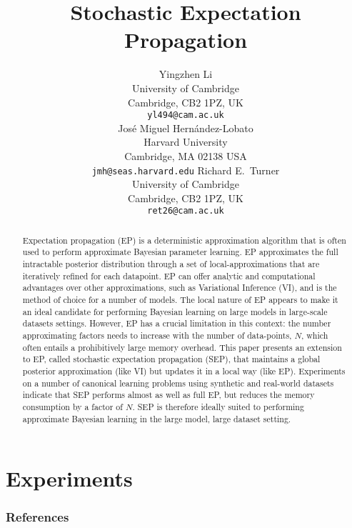 \documentclass{article} %
\title{Stochastic Expectation Propagation}
\author{
Yingzhen Li \\
University of Cambridge\\
Cambridge, CB2 1PZ, UK \\
\texttt{yl494@cam.ac.uk} \\
\And
Jos\'e Miguel Hern\'andez-Lobato\\
Harvard University \\
Cambridge, MA 02138 USA \\
\texttt{jmh@seas.harvard.edu}
\And
Richard E.~Turner \\
University of Cambridge\\
Cambridge, CB2 1PZ, UK \\
\texttt{ret26@cam.ac.uk} \\
}
\begin{document}
\maketitle

\begin{abstract}
Expectation propagation (EP) is a deterministic approximation algorithm that is often used to perform approximate Bayesian parameter learning. EP approximates the full intractable posterior distribution through a set of local-approximations that are iteratively refined for each datapoint. EP can offer analytic and computational advantages over other approximations, such as Variational Inference (VI), and is the method of choice for a number of models. The local nature of EP appears to make it an ideal candidate for performing Bayesian learning on large models in large-scale datasets settings. However, EP has a crucial limitation in this context: the number approximating factors needs to increase with the number of data-points, $N$, which often entails a prohibitively large memory overhead. This paper presents an extension to EP, called stochastic expectation propagation (SEP), that maintains a global posterior approximation (like VI) but updates it in a local way (like EP).  Experiments on a number of canonical learning problems using synthetic and real-world datasets indicate that SEP performs almost as well as full EP, but reduces the memory consumption by a factor of $N$. SEP is therefore ideally suited to performing approximate Bayesian learning in the large model, large dataset setting.

\end{abstract}







%

%

\section{Experiments}






\subsubsection*{References}
\renewcommand{\section}[2]{}


\end{document}
